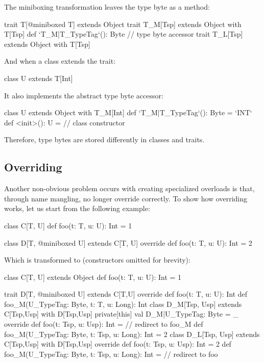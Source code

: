 The miniboxing transformation leaves the type byte as a method:

\begin{lstlisting-nobreak}
trait T[@miniboxed T] extends Object
trait T_M[Tsp] extends Object with T[Tsp] {
  def `T_M|T_TypeTag`(): Byte // type byte accessor
}
trait T_L[Tsp] extends Object with T[Tsp]
\end{lstlisting-nobreak}

And when a class extends the trait:

\begin{lstlisting-nobreak}
class U extends T[Int]
\end{lstlisting-nobreak}

It also implements the abstract type byte accessor:

\begin{lstlisting-nobreak}
class U extends Object with T_M[Int] {
  def `T_M|T_TypeTag`(): Byte = `INT`
  def <init>(): U = // class constructor
}
\end{lstlisting-nobreak}

Therefore, type bytes are stored differently in classes and traits.

\subsection{Overriding}

Another non-obvious problem occurs with creating specialized overloads is that, through name mangling, no longer override correctly.
To show how overriding works, let us start from the following example:

\begin{lstlisting-nobreak}
class C[T, U] {
  def foo(t: T, u: U): Int = 1
}

class D[T, @miniboxed U] extends C[T, U] {
  override def foo(t: T, u: U): Int = 2
}
\end{lstlisting-nobreak}

Which is transformed to (constructors omitted for brevity):

\begin{lstlisting-nobreak}
class C[T, U] extends Object {
  def foo(t: T, u: U): Int = 1
}

trait D[T, @miniboxed U] extends C[T,U] {
  override def foo(t: T, u: U): Int
  def foo_M(U_TypeTag: Byte, t: T, u: Long): Int
}
class D_M[Tsp, Usp] extends C[Tsp,Usp] with D[Tsp,Usp] {
  private[this] val D_M|U_TypeTag: Byte = _
  override def foo(t: Tsp, u: Usp): Int = // redirect to foo_M
  def foo_M(U_TypeTag: Byte, t: Tsp, u: Long): Int = 2
}
class D_L[Tsp, Usp] extends C[Tsp,Usp] with D[Tsp,Usp] {
  override def foo(t: Tsp, u: Usp): Int = 2
  def foo_M(U_TypeTag: Byte, t: Tsp, u: Long): Int = // redirect to foo
}
\end{lstlisting-nobreak}

